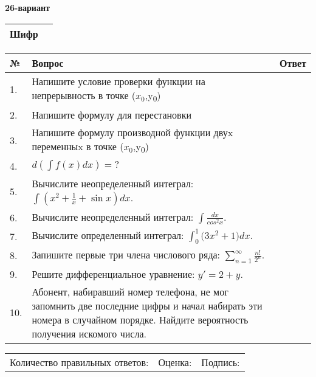 \documentclass{article}
\begin{document}
  \egroup
  
  \newpage
  
  
  \textbf{26-вариант}\\
  
  \bgroup
  \def\arraystretch{1.6} %
  
  \begin{tabular}{|m{5.7cm}|m{9.5cm}|}
  \hline
  Шифр & \\
  \hline
  \end{tabular}
  
  \vspace{1cm}
  
  \begin{tabular}{|m{0.7cm}|m{10cm}|m{4cm}|}
  \hline
  № & Вопрос & Ответ \\
  \hline
  1. & Напишите условие проверки функции на непрерывность в точке (\(x_{0}\),y\textsubscript{0}) &  \\
  \hline
  2. & Напишите формулу для перестановки &  \\
  \hline
  3. & Напишите формулу производной функции двуx переменныx в точке (\(x_{0}\),y\textsubscript{0}) &  \\
  \hline
  4. & \(d\left( \int{f(x)dx} \right) = ?\) &  \\
  \hline
  5. & Вычислите неопределенный интеграл: \(\int{\left( x^{2} + \frac{1}{x} + \sin x \right)dx}\). &  \\
  \hline
  6. & Вычислите неопределенный интеграл: \(\int\frac{dx}{cos^{2}x}\). &  \\
  \hline
  7. & Вычислите определенный интеграл: \(\int_{0}^{1}{(3x^{2}} + 1)dx\). &  \\
  \hline
  8. & Запишите первые три члена числового ряда: \(\sum_{n = 1}^{\infty}\frac{n!}{2^{n}}\). &  \\
  \hline
  9. & Решите дифференциальное уравнение: \(y' = 2 + y\). &  \\
  \hline
  10. & Абонент, набиравший номер телефона, не мог запомнить две последние цифры и начал набирать эти номера в случайном порядке. Найдите вероятность получения искомого числа. &  \\
  \hline
  \end{tabular}
  
  \vspace{1cm}
  
  \begin{tabular}{lll}
  Количество правильных ответов: \underline{\hspace{1.5cm}} & 
  Оценка: \underline{\hspace{1.5cm}} & 
  Подпись: \underline{\hspace{2cm}} \\
  \end{tabular}
  
\end{document}
